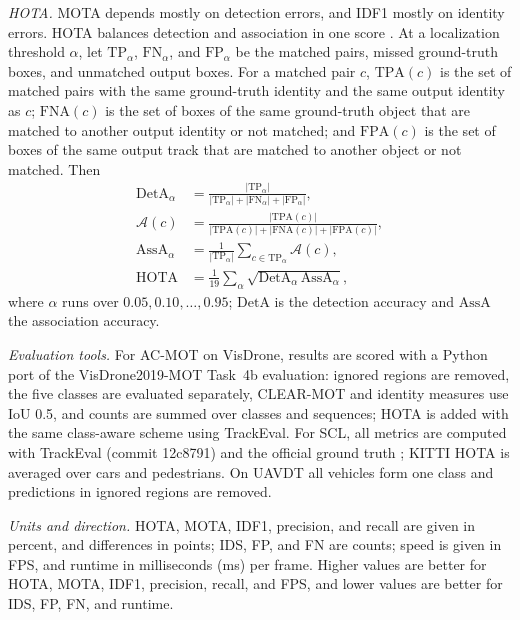 \emph{HOTA.} MOTA depends mostly on detection errors, and IDF1 mostly on identity errors. HOTA balances detection and association in one score \cite{luiten2021hota}. At a localization threshold $\alpha$, let $\mathrm{TP}_\alpha$, $\mathrm{FN}_\alpha$, and $\mathrm{FP}_\alpha$ be the matched pairs, missed ground-truth boxes, and unmatched output boxes. For a matched pair $c$, $\mathrm{TPA}(c)$ is the set of matched pairs with the same ground-truth identity and the same output identity as $c$; $\mathrm{FNA}(c)$ is the set of boxes of the same ground-truth object that are matched to another output identity or not matched; and $\mathrm{FPA}(c)$ is the set of boxes of the same output track that are matched to another object or not matched. Then
\begin{align}
\mathrm{DetA}_\alpha&=\frac{|\mathrm{TP}_\alpha|}{|\mathrm{TP}_\alpha|+|\mathrm{FN}_\alpha|+|\mathrm{FP}_\alpha|},\label{eq:res-deta}\\
\mathcal{A}(c)&=\frac{|\mathrm{TPA}(c)|}{|\mathrm{TPA}(c)|+|\mathrm{FNA}(c)|+|\mathrm{FPA}(c)|},\label{eq:res-ac}\\
\mathrm{AssA}_\alpha&=\frac{1}{|\mathrm{TP}_\alpha|}\sum_{c\in\mathrm{TP}_\alpha}\mathcal{A}(c),\label{eq:res-assa}\\
\mathrm{HOTA}&=\frac{1}{19}\sum_{\alpha}\sqrt{\mathrm{DetA}_\alpha\,\mathrm{AssA}_\alpha},\label{eq:res-hota}
\end{align}
where $\alpha$ runs over $0.05, 0.10, \dots, 0.95$; $\mathrm{DetA}$ is the detection accuracy and $\mathrm{AssA}$ the association accuracy.

\emph{Evaluation tools.} For AC-MOT on VisDrone, results are scored with a Python port of the VisDrone2019-MOT Task~4b evaluation: ignored regions are removed, the five classes are evaluated separately, CLEAR-MOT and identity measures use IoU 0.5, and counts are summed over classes and sequences; HOTA is added with the same class-aware scheme using TrackEval. For SCL, all metrics are computed with TrackEval (commit 12c8791) and the official ground truth \cite{dendorfer2021motchallenge}; KITTI HOTA is averaged over cars and pedestrians. On UAVDT all vehicles form one class and predictions in ignored regions are removed.

\emph{Units and direction.} HOTA, MOTA, IDF1, precision, and recall are given in percent, and differences in points; IDS, FP, and FN are counts; speed is given in FPS, and runtime in milliseconds (ms) per frame. Higher values are better for HOTA, MOTA, IDF1, precision, recall, and FPS, and lower values are better for IDS, FP, FN, and runtime.

